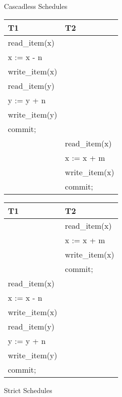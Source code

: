 \documentclass[12pt]{article}
\begin{document}
\begin{enumerate}
	
	\pagebreak
\begin{center}
 		Cascadless Schedules
 \end{center}
    \begin{minipage}{.5\linewidth}
  
      \centering
       \begin{tabular}{|l|l|}
\hline
T1 & T2 \\ \hline
read\_item(x) &  \\ \hline
x := x - n &  \\ \hline
write\_item(x) &  \\ \hline
read\_item(y) &  \\ \hline
y := y + n &  \\ \hline
write\_item(y) &  \\ \hline
commit; &  \\ \hline
 & read\_item(x) \\ \hline
 & x := x + m \\ \hline
 & write\_item(x) \\ \hline
 & commit; \\ \hline
\end{tabular}
    \end{minipage}%
    \begin{minipage}{.5\linewidth}
      \centering

\begin{tabular}{|l|l|}
\hline
T1 & T2 \\ \hline
 & read\_item(x) \\ \hline
 & x := x + m \\ \hline
 & write\_item(x) \\ \hline
 & commit; \\ \hline
read\_item(x) &  \\ \hline
x := x - n &  \\ \hline
write\_item(x) &  \\ \hline
read\_item(y) &  \\ \hline
y := y + n &  \\ \hline
write\_item(y) &  \\ \hline
commit; &  \\ \hline
\end{tabular}
    \end{minipage} 


\begin{center}
 		Strict Schedules
 \end{center}
    \begin{minipage}{.5\linewidth}
  

\end{minipage}
\end{enumerate}
\end{document}
